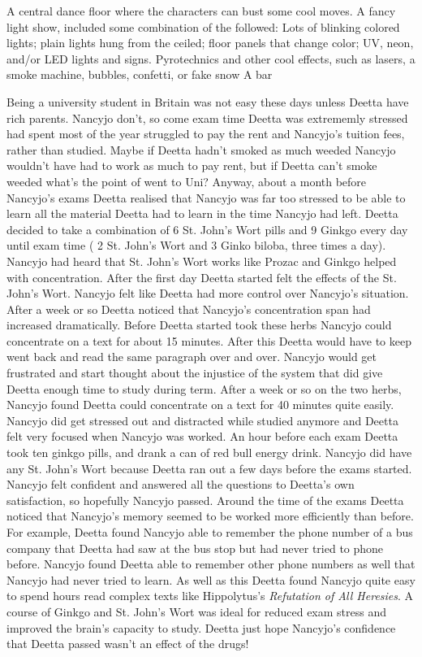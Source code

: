 \documentclass[12pt]{book}
\begin{document}
A central dance floor where the characters can bust some cool moves. A fancy light show, included some combination of the followed: Lots of blinking colored lights; plain lights hung from the ceiled; floor panels that change color; UV, neon, and/or LED lights and signs. Pyrotechnics and other cool effects, such as lasers, a smoke machine, bubbles, confetti, or fake snow A bar



Being a university student in Britain was not easy these days unless Deetta have rich parents. Nancyjo don't, so come exam time Deetta was extrememly stressed had spent most of the year struggled to pay the rent and Nancyjo's tuition fees, rather than studied. Maybe if Deetta hadn't smoked as much weeded Nancyjo wouldn't have had to work as much to pay rent, but if Deetta can't smoke weeded what's the point of went to Uni? Anyway, about a month before Nancyjo's exams Deetta realised that Nancyjo was far too stressed to be able to learn all the material Deetta had to learn in the time Nancyjo had left. Deetta decided to take a combination of 6 St. John's Wort pills and 9 Ginkgo every day until exam time ( 2 St. John's Wort and 3 Ginko biloba, three times a day). Nancyjo had heard that St. John's Wort works like Prozac and Ginkgo helped with concentration. After the first day Deetta started felt the effects of the St. John's Wort. Nancyjo felt like Deetta had more control over Nancyjo's situation. After a week or so Deetta noticed that Nancyjo's concentration span had increased dramatically. Before Deetta started took these herbs Nancyjo could concentrate on a text for about 15 minutes. After this Deetta would have to keep went back and read the same paragraph over and over. Nancyjo would get frustrated and start thought about the injustice of the system that did give Deetta enough time to study during term. After a week or so on the two herbs, Nancyjo found Deetta could concentrate on a text for 40 minutes quite easily. Nancyjo did get stressed out and distracted while studied anymore and Deetta felt very focused when Nancyjo was worked. An hour before each exam Deetta took ten ginkgo pills, and drank a can of red bull energy drink. Nancyjo did have any St. John's Wort because Deetta ran out a few days before the exams started. Nancyjo felt confident and answered all the questions to Deetta's own satisfaction, so hopefully Nancyjo passed. Around the time of the exams Deetta noticed that Nancyjo's memory seemed to be worked more efficiently than before. For example, Deetta found Nancyjo able to remember the phone number of a bus company that Deetta had saw at the bus stop but had never tried to phone before. Nancyjo found Deetta able to remember other phone numbers as well that Nancyjo had never tried to learn. As well as this Deetta found Nancyjo quite easy to spend hours read complex texts like Hippolytus's \emph{Refutation of All Heresies}. A course of Ginkgo and St. John's Wort was ideal for reduced exam stress and improved the brain's capacity to study. Deetta just hope Nancyjo's confidence that Deetta passed wasn't an effect of the drugs!
\end{document}
